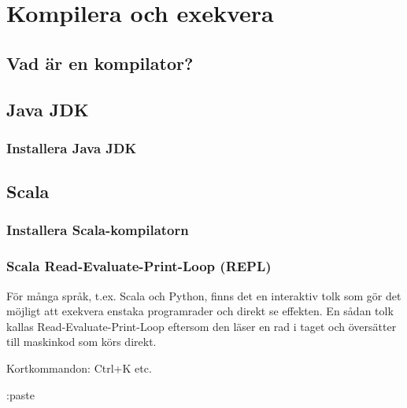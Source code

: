 
\chapter{Kompilera och exekvera}\label{appendix:compile}

\section{Vad är en kompilator?}

\section{Java JDK}

\subsection{Installera Java JDK}

\section{Scala}

\subsection{Installera Scala-kompilatorn}

\subsection{Scala Read-Evaluate-Print-Loop (REPL)}\label{appendix:compile:REPL}

För många språk, t.ex. Scala och Python, finns det en interaktiv tolk som gör det möjligt att exekvera enstaka programrader och direkt se effekten. En sådan tolk kallas Read-Evaluate-Print-Loop eftersom den läser en rad i taget och översätter till maskinkod som körs direkt.    

\TODO Kortkommandon: Ctrl+K etc.

\TODO :paste


